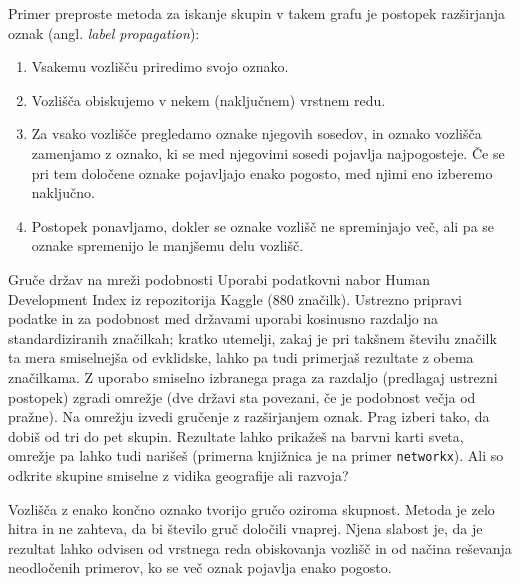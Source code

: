 Primer preproste metoda za iskanje skupin v takem grafu je postopek razširjanja oznak (angl. {\em label propagation}):
\begin{enumerate}
\item Vsakemu vozlišču priredimo svojo oznako.
\item Vozlišča obiskujemo v nekem (naključnem) vrstnem redu.
\item Za vsako vozlišče pregledamo oznake njegovih sosedov, in oznako vozlišča zamenjamo z oznako, ki se med njegovimi sosedi pojavlja najpogosteje. Če se pri tem določene oznake pojavljajo enako pogosto, med njimi eno izberemo naključno.
\item Postopek ponavljamo, dokler se oznake vozlišč ne spreminjajo več, ali pa se oznake spremenijo le manjšemu delu vozlišč.
\end{enumerate}

\begin{exercise}{Gruče držav na mreži podobnosti}
Uporabi podatkovni nabor Human Development Index iz repozitorija Kaggle (880 značilk). Ustrezno pripravi podatke in za podobnost med državami uporabi kosinusno razdaljo na standardiziranih značilkah; kratko utemelji, zakaj je pri takšnem številu značilk ta mera smiselnejša od evklidske, lahko pa tudi primerjaš rezultate z obema značilkama. Z uporabo smiselno izbranega praga za razdaljo (predlagaj ustrezni postopek) zgradi omrežje (dve državi sta povezani, če je podobnost večja od pražne). Na omrežju izvedi gručenje z razširjanjem oznak. Prag izberi tako, da dobiš od tri do pet skupin. Rezultate lahko prikažeš na barvni karti sveta, omrežje pa lahko tudi narišeš (primerna knjižnica je na primer \texttt{networkx}). Ali so odkrite skupine smiselne z vidika geografije ali razvoja?
\end{exercise}

%
%
Vozlišča z enako končno oznako tvorijo gručo oziroma skupnost. Metoda je zelo hitra in ne zahteva, da bi število gruč določili vnaprej. Njena slabost je, da je rezultat lahko odvisen od vrstnega reda obiskovanja vozlišč in od načina reševanja neodločenih primerov, ko se več oznak pojavlja enako pogosto.

